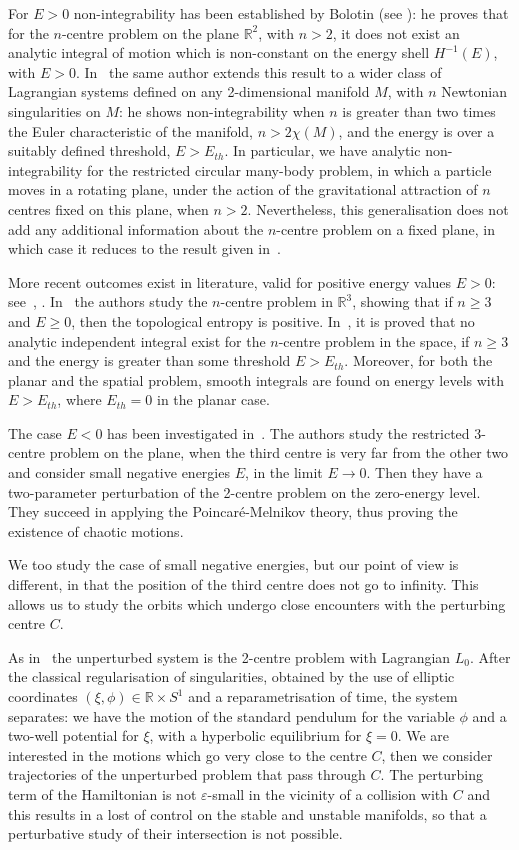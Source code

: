 \documentclass[a4paper]{article}
\begin{document}
For $E>0$ non-integrability has been established by Bolotin (see
\cite{Bol1}): he proves that for the $n$-centre problem on the plane
${\mathbb{R}}^2$, with $n>2$, it does not exist an analytic integral of motion
which is non-constant on the energy shell $H^{-1}(E)$, with $E>0$.
In~\cite{Bol2} the same author extends this result to a wider class of
Lagrangian systems defined on any 2-dimensional manifold $M$, with $n$
Newtonian singularities on $M$: he shows non-integrability when $n$ is
greater than two times the Euler characteristic of the manifold,
$n>2\chi(M)$, and the energy is over a suitably defined threshold,
$E>E_{th}$.  In particular, we have analytic non-integrability for the
restricted circular many-body problem, in which a particle moves in a
rotating plane, under the action of the gravitational attraction of
$n$ centres fixed on this plane, when $n>2$.  Nevertheless, this
generalisation does not add any additional information about the
$n$-centre problem on a fixed plane, in which case it reduces to the
result given in~\cite{Bol1}.

More recent outcomes exist in literature, valid for positive energy
values $E>0$: see~\cite{BN1}, \cite{KT}.  In~\cite{BN1} the authors
study the $n$-centre problem in ${\mathbb{R}}^3$, showing that if $n\geq3$ and
$E \geq 0$, then the topological entropy is positive.  In~\cite{KT},
it is proved that no analytic independent integral exist for the
$n$-centre problem in the space, if $n \geq 3$ and the energy is
greater than some threshold $E>E_{th}$.  Moreover, for both the planar
and the spatial problem, smooth integrals are found on energy levels
with $E>E_{th}$, where $E_{th}=0$ in the planar case.

The case $E<0$ has been investigated in~\cite{BN2}. The authors study
the restricted 3-centre problem on the plane, when the third centre is
very far from the other two and consider small negative energies $E$,
in the limit $E\rightarrow 0$. Then they have a two-parameter
perturbation of the 2-centre problem on the zero-energy level. They
succeed in applying the Poincar\'e-Melnikov theory, thus proving the
existence of chaotic motions.

We too study the case of small negative energies, but our point of
view is different, in that the position of the third centre does not
go to infinity.
This allows us to study the orbits which undergo close encounters with
the perturbing centre $C$.

As in~\cite{BN2} the unperturbed system is the 2-centre problem with
Lagrangian $L_0$. After the classical regularisation of singularities,
obtained by the use of elliptic coordinates $(\xi, \phi) \in {\mathbb{R}} \times
S^1$ and a reparametrisation of time, the system separates: we have
the motion of the standard pendulum for the variable $\phi$ and a
two-well potential for $\xi$, with a hyperbolic equilibrium for $\xi =
0$.
We are interested in the motions which go very close to the centre
$C$, then we consider trajectories of the unperturbed problem that
pass through $C$.
The perturbing term of the Hamiltonian is not $\varepsilon$-small in
the vicinity of a collision with $C$ and this results in a lost of
control on the stable and unstable manifolds, so that a perturbative
study of their intersection is not possible.
\end{document}
